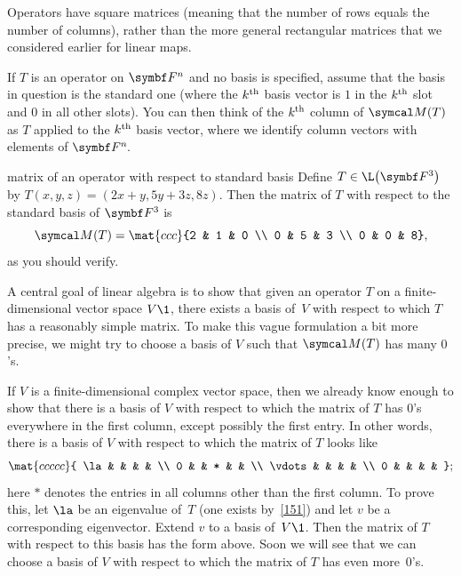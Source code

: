 Operators have square matrices (meaning that the number of rows equals the number of columns), rather than the more general rectangular matrices that we considered earlier for linear maps.


If $T$ is an operator on $\F{n}$ and no basis is specified, assume that the basis in question is the standard one \big(where the $k^{\text{{th}}}$ basis vector is $1$ in the $k^{\text{{th}}}$ slot and $0$ in all other slots\big).  You can then think of the $k^{\text{{th}}}$ column of $\M(T)$ as $T$ applied to the $k^{\text{{th}}}$ basis vector, where we identify  column vectors with elements of $\FF n$.

\begin{example}[uppertmat]{matrix of an operator with respect to standard basis}
Define $T \in \L\paren[\big]{\F3}$ by $T(x, y, z) = (2x + y, 5y + 3z, 8z)$. Then the matrix of $T$ with respect to the standard basis of $\F3$ is
\[
\M(T) = \mat{ccc}{2 & 1 & 0 \\
0 & 5 & 3 \\
0 & 0 & 8},
\]
as you should verify.
\end{example}

A central goal of linear algebra is to show that given an operator $T$ on a finite-dimensional vector space $V\1$, there exists a basis of~$V$ with respect to which $T$ has a reasonably simple matrix. To make this vague formulation a bit more precise, we might try to choose a basis of $V$ such that $\M(T)$ has many $0$'s.

\pagebreak[3]

If $V$ is a finite-dimensional complex vector space, then we already know enough to show that there is a basis of $V$ with respect to which the matrix of $T$ has $0$'s everywhere in
the first column, except possibly the first entry.  In other words, there is a basis
of $V$ with respect to which the matrix of $T$ looks like
\[
\mat{ccccc}{
\la & & & & \\
0 & & * & & \\
\vdots & & & & \\
0 & & & & };
\]
here $*$ denotes the entries in all columns other than the first column.
To prove this, let $\la$ be an eigenvalue of~$T$ (one exists by~\ref{151}) and let $v$
be a corresponding eigenvector.  Extend $v$ to a basis of~$V\1$. Then the
matrix of $T$ with respect to this basis has the form above.
Soon we will see that we can choose a basis of $V$ with respect to which the matrix of $T$ has even more~$0$'s.

